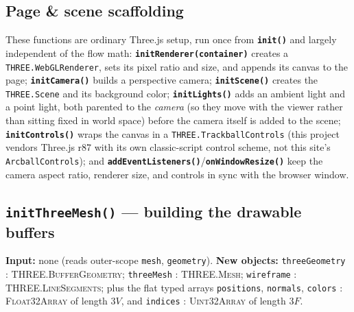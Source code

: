 \documentclass[11pt]{article}
\newcommand{\code}[1]{\texttt{#1}}
\newcommand{\func}[1]{\texttt{\textbf{#1}}}
\newcommand{\type}[1]{\textsc{#1}}
\begin{document}
\begin{center}
\end{center}

\subsection{Page \& scene scaffolding}
\label{sec:scaffolding}
These functions are ordinary Three.js setup, run once from \func{init()} and largely
independent of the flow math: \func{initRenderer(container)} creates a
\code{THREE.WebGLRenderer}, sets its pixel ratio and size, and appends its canvas to the
page; \func{initCamera()} builds a perspective camera; \func{initScene()} creates the
\code{THREE.Scene} and its background color; \func{initLights()} adds an ambient light and
a point light, both parented to the \emph{camera} (so they move with the viewer rather than
sitting fixed in world space) before the camera itself is added to the scene;
\func{initControls()} wraps the canvas in a \code{THREE.TrackballControls} (this project
vendors Three.js r87 with its own classic-script control scheme, not this site's
\code{ArcballControls}); and \func{addEventListeners()}/\func{onWindowResize()} keep the
camera aspect ratio, renderer size, and controls in sync with the browser window.

\subsection{\func{initThreeMesh()} --- building the drawable buffers}
\label{sec:initthreemesh}
\textbf{Input:} none (reads outer-scope \code{mesh}, \code{geometry}). \textbf{New
objects:} \code{threeGeometry} : \type{THREE.BufferGeometry}; \code{threeMesh} :
\type{THREE.Mesh}; \code{wireframe} : \type{THREE.LineSegments}; plus the flat typed
arrays \code{positions}, \code{normals}, \code{colors} : \type{Float32Array} of length
$3V$, and \code{indices} : \type{Uint32Array} of length $3F$.
\end{document}

